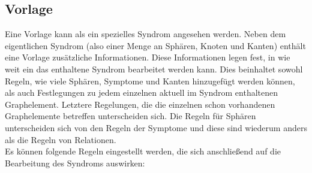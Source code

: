 \documentclass[enabledeprecatedfontcommands,fontsize=11pt,paper=a4,twoside]{scrartcl}
\newcounter{one}
\begin{document}
\newpage
\subsection{Vorlage} \label{template}
Eine Vorlage kann als ein spezielles Syndrom angesehen werden. Neben dem eigentlichen Syndrom (also einer Menge an Sphären, Knoten und Kanten) enthält eine Vorlage zusätzliche Informationen. Diese Informationen legen fest, in wie weit ein das enthaltene Syndrom bearbeitet werden kann. Dies beinhaltet sowohl Regeln, wie viele Sphären, Symptome und Kanten hinzugefügt werden können, als auch Festlegungen zu jedem einzelnen aktuell im Syndrom enthaltenen Graphelement. Letztere Regelungen, die die einzelnen schon vorhandenen Graphelemente betreffen unterscheiden sich. Die Regeln für Sphären unterscheiden sich von den Regeln der Symptome und diese sind wiederum anders als die Regeln von Relationen. \\ Es können folgende Regeln eingestellt werden, die sich anschließend auf die Bearbeitung des Syndroms auswirken:
\end{document}
